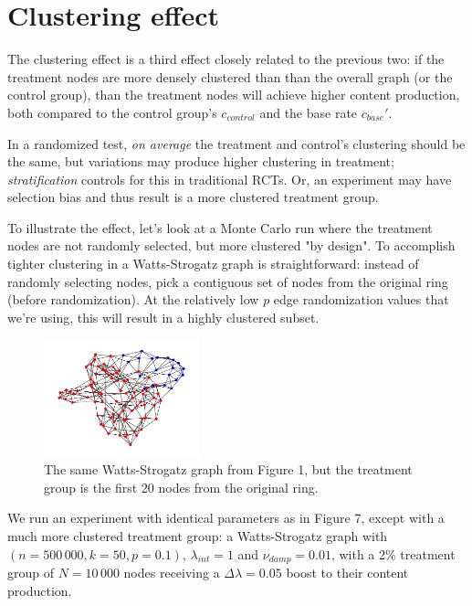 \documentclass[final,5p,times,twocolumn,authoryear]{elsarticle}
\begin{document}
\section{Clustering effect}

The clustering effect is a third effect closely related to the previous two: if the treatment nodes are more densely clustered than than the overall graph (or the control group), than the treatment nodes will achieve higher content production, both compared to the control group's $c_{control}$ and the base rate $c_{base}\prime$.

In a randomized test, \textit{on average} the treatment and control's clustering should be the same, but variations may produce higher clustering in treatment; \textit{stratification} controls for this in traditional RCTs. Or, an experiment may have selection bias and thus result is a more clustered treatment group.

To illustrate the effect, let's look at a Monte Carlo run where the treatment nodes are not randomly selected, but more clustered "by design". To accomplish tighter clustering in a Watts-Strogatz graph is straightforward: instead of randomly selecting nodes, pick a contiguous set of nodes from the original ring (before randomization). At the relatively low $p$ edge randomization values that we're using, this will result in a highly clustered subset.

\begin{figure}[h]
	\centering 
	\includegraphics[width=0.4\textwidth]{figure-12.png}	
	\caption{The same Watts-Strogatz graph from Figure 1, but the treatment group is the first 20 nodes from the original ring.} 
\end{figure}

We run an experiment with identical parameters as in Figure 7, except with a much more clustered treatment group: a Watts-Strogatz graph with $(n=500\,000, k=50, p=0.1)$, $\lambda_{int} = 1$ and $\nu_{damp} = 0.01$, with a 2\% treatment group of $N=10\,000$ nodes receiving a $\Delta \lambda = 0.05$ boost to their content production.
\end{document}
